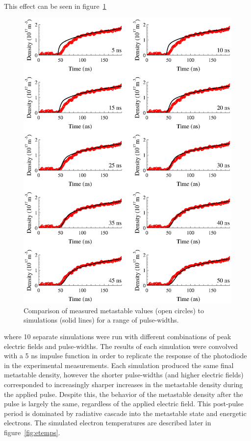 This effect can be seen in figure~\ref{fig:widths}
\begin{figure}
  \centering
  \includegraphics{./chapters/modeling/figures/widths.eps}
  \caption{Comparison of measured metastable values (open circles) to
    simulations (solid lines) for a range of pulse-widths.}
  \label{fig:widths}
\end{figure}
where 10 separate simulations were run with different combinations of peak
electric fields and pulse-widths. The results of each simulation were convolved
with a 5 ns impulse function in order to replicate the response of the
photodiode in the experimental measurements. Each simulation produced the same
final metastable density, however the shorter pulse-widths (and higher electric
fields) corresponded to increasingly sharper increases in the metastable density
during the applied pulse. Despite this, the behavior of the metastable density
after the pulse is largely the same, regardless of the applied electric field.
This post-pulse period is dominated by radiative cascade into the metastable
state and energetic electrons. The simulated electron temperatures are described
later in figure~\ref{fig:etemps}.

